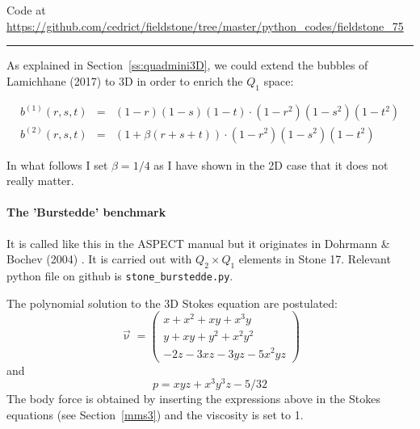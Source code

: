 

\begin{center}
Code at \url{https://github.com/cedrict/fieldstone/tree/master/python_codes/fieldstone_75}
\end{center}

\par\noindent\rule{\textwidth}{0.4pt}


As explained in Section~\ref{ss:quadmini3D}, we could extend the bubbles 
of Lamichhane (2017) \cite{lami17} to 3D in order to enrich the $Q_1$ space:

\begin{eqnarray}
b^{(1)} (r,s,t) &=& (1-r)(1-s)(1-t) \cdot (1-r^2) (1-s^2) (1-t^2) \\
b^{(2)} (r,s,t) &=& (1 + \beta(r+s+t)) \cdot (1-r^2) (1-s^2) (1-t^2) 
\end{eqnarray}

In what follows I set $\beta=1/4$ as I have shown in the 2D case that it does not really matter. 

\paragraph{The 'Burstedde' benchmark} It is called like this in the ASPECT manual 
but it originates in Dohrmann \& Bochev (2004) \cite{dobo04}. It is carried 
out with $Q_2 \times Q_1$ elements in Stone 17. 
Relevant python file on github is {\tt stone\_burstedde.py}.

The polynomial solution to the 3D Stokes equation are postulated:
\begin{equation}
\vec{\upnu}
=
\left(
\begin{array}{c}
x+x^2+xy+x^3y \\
y + xy + y^2 + x^2 y^2\\
-2z - 3xz - 3yz - 5x^2 yz
\end{array}
\right)
\label{eqbur}
\end{equation}
and
\begin{equation}
p = xyz + x^3 y^3z - 5/32
\end{equation}
The body force is obtained by inserting the expressions above in the Stokes equations
(see Section~\ref{mms3}) and the viscosity is set to 1.


